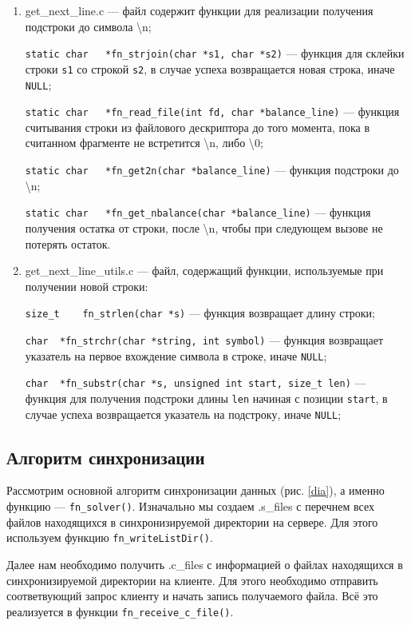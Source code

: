 \begin{enumerate}
	\item get\_next\_line.c --- файл содержит функции для реализации получения подстроки до символа \textbackslash{n};
	
	\verb|static char	*fn_strjoin(char *s1, char *s2)| --- функция для склейки строки \verb|s1| со строкой \verb|s2|, в случае успеха возвращается новая строка, иначе \verb|NULL|;
	
	\verb|static char	*fn_read_file(int fd, char *balance_line)| --- функция считывания строки  из файлового дескриптора до того момента, пока в считанном фрагменте не встретится \textbackslash{n}, либо \textbackslash{0};
	
	\verb|static char	*fn_get2n(char *balance_line)| --- функция подстроки до \textbackslash{n};
	
	\verb|static char	*fn_get_nbalance(char *balance_line)| --- функция получения остатка от строки, после \textbackslash{n}, чтобы при следующем вызове не потерять остаток.
	
	\item get\_next\_line\_utils.c --- файл, содержащий функции, используемые при получении новой строки:
	
	\verb|size_t	fn_strlen(char *s)| --- функция возвращает длину строки;
	
	
	\verb|char	*fn_strchr(char *string, int symbol)| --- функция возвращает указатель на первое вхождение символа в строке, иначе \verb|NULL|;
	
	\verb|char	*fn_substr(char *s, unsigned int start, size_t len)| --- функция для получения подстроки длины \verb|len| начиная с позиции \verb|start|, в случае успеха возвращается указатель на подстроку, иначе \verb|NULL|;
\end{enumerate}

\subsection{Алгоритм синхронизации}
Рассмотрим основной алгоритм синхронизации данных (рис. \ref{dia}), а именно функцию --- \verb|fn_solver()|.
Изначально мы создаем .s\_files с перечнем всех файлов находящихся в синхронизируемой директории на сервере. Для этого используем функцию  \verb|fn_writeListDir()|.

Далее нам необходимо получить .c\_files с информацией о файлах находящихся в синхронизируемой директории на клиенте. Для этого необходимо отправить соответвующий запрос клиенту и начать запись получаемого файла. Всё это реализуется в функции \verb|fn_receive_c_file()|.


